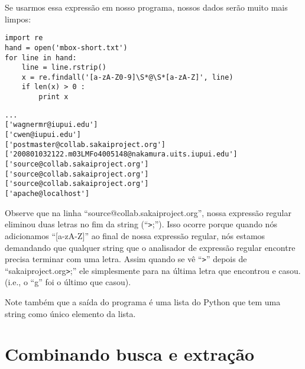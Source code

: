 
Se usarmos essa expressão em nosso programa, nossos dados serão muito mais limpos:

\beforeverb
\begin{verbatim}
import re
hand = open('mbox-short.txt')
for line in hand:
    line = line.rstrip()
    x = re.findall('[a-zA-Z0-9]\S*@\S*[a-zA-Z]', line)
    if len(x) > 0 :
        print x
\end{verbatim}
\afterverb
%

\beforeverb
\begin{verbatim}
...
['wagnermr@iupui.edu']
['cwen@iupui.edu']
['postmaster@collab.sakaiproject.org']
['200801032122.m03LMFo4005148@nakamura.uits.iupui.edu']
['source@collab.sakaiproject.org']
['source@collab.sakaiproject.org']
['source@collab.sakaiproject.org']
['apache@localhost']
\end{verbatim}
\afterverb
%

Observe que na linha ``source@collab.sakaiproject.org'', nossa expressão
regular eliminou duas letras no fim da string (``\verb">";''). Isso ocorre
porque quando nós adicionamos ``[a-zA-Z]'' ao final de nossa expressão
regular, nós estamos demandando que qualquer string que o analisador de
expressão regular encontre precisa terminar com uma letra. Assim quando se
vê ``\verb">"'' depois de ``sakaiproject.org\verb">";'' ele simplesmente para
na última letra que encontrou e casou. (i.e., o ``g'' foi o último que casou).

Note também que a saída do programa é uma lista do Python que tem uma string
como único elemento da lista.

\section{Combinando busca e extração}

